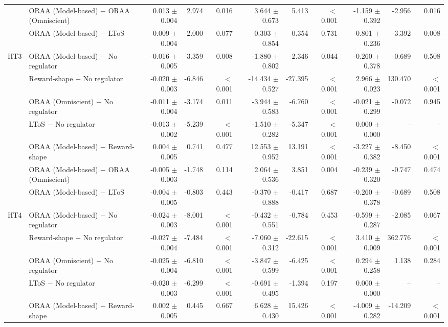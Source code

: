 \begin{tabular}{llrrrrrrrrr}
 & ORAA (Model-based) $-$ ORAA (Omniscient) & 0.013 $\pm$ 0.004 & 2.974 & 0.016 & 3.644 $\pm$ 0.673 & 5.413 & $<$0.001 & -1.159 $\pm$ 0.392 & -2.956 & 0.016 \\
 & ORAA (Model-based) $-$ LToS & -0.009 $\pm$ 0.004 & -2.000 & 0.077 & -0.303 $\pm$ 0.854 & -0.354 & 0.731 & -0.801 $\pm$ 0.236 & -3.392 & 0.008 \\
\addlinespace
HT3 & ORAA (Model-based) $-$ No regulator & -0.016 $\pm$ 0.005 & -3.359 & 0.008 & -1.880 $\pm$ 0.802 & -2.346 & 0.044 & -0.260 $\pm$ 0.378 & -0.689 & 0.508 \\
 & Reward-shape $-$ No regulator & -0.020 $\pm$ 0.003 & -6.846 & $<$0.001 & -14.434 $\pm$ 0.527 & -27.395 & $<$0.001 & 2.966 $\pm$ 0.023 & 130.470 & $<$0.001 \\
 & ORAA (Omniscient) $-$ No regulator & -0.011 $\pm$ 0.004 & -3.174 & 0.011 & -3.944 $\pm$ 0.583 & -6.760 & $<$0.001 & -0.021 $\pm$ 0.299 & -0.072 & 0.945 \\
 & LToS $-$ No regulator & -0.013 $\pm$ 0.002 & -5.239 & $<$0.001 & -1.510 $\pm$ 0.282 & -5.347 & $<$0.001 & 0.000 $\pm$ 0.000 & -- & -- \\
 & ORAA (Model-based) $-$ Reward-shape & 0.004 $\pm$ 0.005 & 0.741 & 0.477 & 12.553 $\pm$ 0.952 & 13.191 & $<$0.001 & -3.227 $\pm$ 0.382 & -8.450 & $<$0.001 \\
 & ORAA (Model-based) $-$ ORAA (Omniscient) & -0.005 $\pm$ 0.003 & -1.748 & 0.114 & 2.064 $\pm$ 0.536 & 3.851 & 0.004 & -0.239 $\pm$ 0.320 & -0.747 & 0.474 \\
 & ORAA (Model-based) $-$ LToS & -0.004 $\pm$ 0.005 & -0.803 & 0.443 & -0.370 $\pm$ 0.888 & -0.417 & 0.687 & -0.260 $\pm$ 0.378 & -0.689 & 0.508 \\
\addlinespace
HT4 & ORAA (Model-based) $-$ No regulator & -0.024 $\pm$ 0.003 & -8.001 & $<$0.001 & -0.432 $\pm$ 0.551 & -0.784 & 0.453 & -0.599 $\pm$ 0.287 & -2.085 & 0.067 \\
 & Reward-shape $-$ No regulator & -0.027 $\pm$ 0.004 & -7.484 & $<$0.001 & -7.060 $\pm$ 0.312 & -22.615 & $<$0.001 & 3.410 $\pm$ 0.009 & 362.776 & $<$0.001 \\
 & ORAA (Omniscient) $-$ No regulator & -0.025 $\pm$ 0.004 & -6.810 & $<$0.001 & -3.847 $\pm$ 0.599 & -6.425 & $<$0.001 & 0.294 $\pm$ 0.258 & 1.138 & 0.284 \\
 & LToS $-$ No regulator & -0.020 $\pm$ 0.003 & -6.299 & $<$0.001 & -0.691 $\pm$ 0.495 & -1.394 & 0.197 & 0.000 $\pm$ 0.000 & -- & -- \\
 & ORAA (Model-based) $-$ Reward-shape & 0.002 $\pm$ 0.005 & 0.445 & 0.667 & 6.628 $\pm$ 0.430 & 15.426 & $<$0.001 & -4.009 $\pm$ 0.282 & -14.209 & $<$0.001 \\

\end{tabular}

